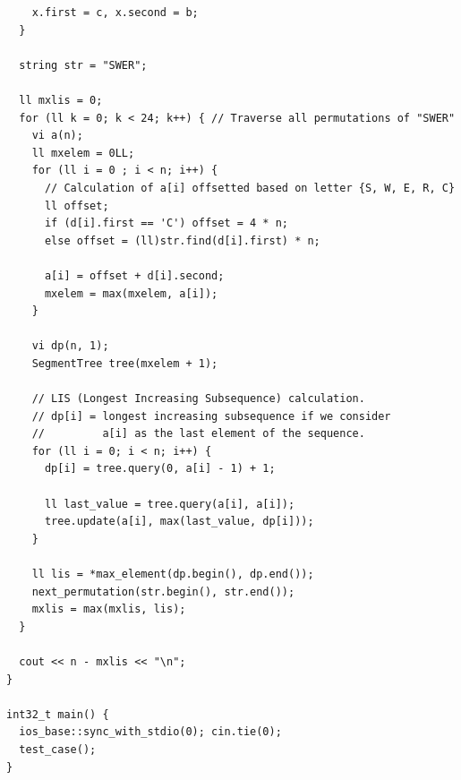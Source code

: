 \begin{verbatim}
    x.first = c, x.second = b;
  }

  string str = "SWER";

  ll mxlis = 0;
  for (ll k = 0; k < 24; k++) { // Traverse all permutations of "SWER"
    vi a(n);
    ll mxelem = 0LL;
    for (ll i = 0 ; i < n; i++) {
      // Calculation of a[i] offsetted based on letter {S, W, E, R, C}
      ll offset;
      if (d[i].first == 'C') offset = 4 * n;
      else offset = (ll)str.find(d[i].first) * n;

      a[i] = offset + d[i].second;
      mxelem = max(mxelem, a[i]);
    }

    vi dp(n, 1);
    SegmentTree tree(mxelem + 1);

    // LIS (Longest Increasing Subsequence) calculation.
    // dp[i] = longest increasing subsequence if we consider
    //         a[i] as the last element of the sequence.
    for (ll i = 0; i < n; i++) {
      dp[i] = tree.query(0, a[i] - 1) + 1;

      ll last_value = tree.query(a[i], a[i]);
      tree.update(a[i], max(last_value, dp[i]));
    }
    
    ll lis = *max_element(dp.begin(), dp.end());
    next_permutation(str.begin(), str.end());
    mxlis = max(mxlis, lis);
  }

  cout << n - mxlis << "\n";
}

int32_t main() {
  ios_base::sync_with_stdio(0); cin.tie(0);
  test_case();
}
    
\end{verbatim}